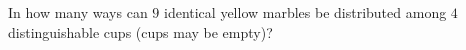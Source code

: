 In how many ways can $9$ identical yellow marbles be distributed among $4$ distinguishable cups (cups may be empty)?

